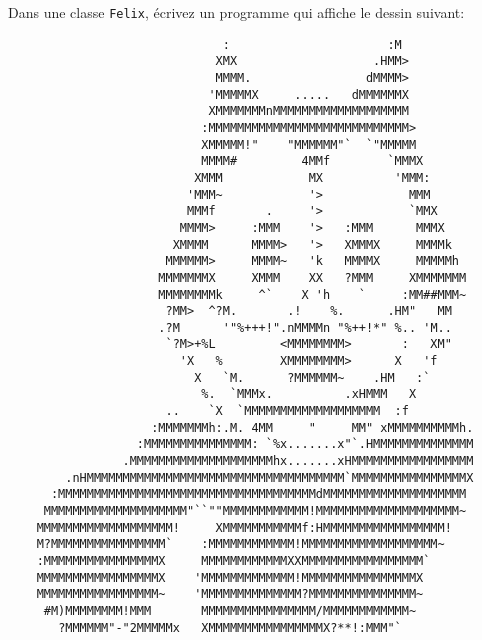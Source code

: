 \documentclass[a4paper,11pt]{article}
\begin{document}
	\newpage
	\Exercice{}
		Dans une classe \texttt{Felix}, écrivez un programme qui affiche le dessin suivant:

	\begin{verbatim}
	                          :                      :M
	                         XMX                   .HMM>
	                         MMMM.                dMMMM>
	                        'MMMMMX     .....   dMMMMMMX
	                        XMMMMMMMnMMMMMMMMMMMMMMMMMMM
	                       :MMMMMMMMMMMMMMMMMMMMMMMMMMMM>
	                       XMMMMM!"    "MMMMMM"`  `"MMMMM
	                       MMMM#         4MMf        `MMMX
	                      XMMM            MX          'MMM:
	                     'MMM~            '>            MMM
	                     MMMf       .     '>            `MMX
	                    MMMM>     :MMM    '>   :MMM      MMMX
	                   XMMMM      MMMM>   '>   XMMMX     MMMMk
	                  MMMMMM>     MMMM~   'k   MMMMX     MMMMMh
	                 MMMMMMMX     XMMM    XX   ?MMM     XMMMMMMM
	                 MMMMMMMMk     ^`    X 'h    `     :MM##MMM~
	                  ?MM>  ^?M.       .!    %.      .HM"   MM
	                 .?M      '"%+++!".nMMMMn "%++!*" %.. 'M..
	                  `?M>+%L         <MMMMMMMM>       :   XM"
	                    'X   %        XMMMMMMMM>      X   'f
	                      X   `M.      ?MMMMMM~    .HM   :`
	                       %.  `MMMx.          .xHMMM   X
	                  ..    `X  `MMMMMMMMMMMMMMMMMMM  :f
	                :MMMMMMMh:.M. 4MM     "     MM" xMMMMMMMMMMh.
	              :MMMMMMMMMMMMMMM: `%x.......x"`.HMMMMMMMMMMMMMM
	            .MMMMMMMMMMMMMMMMMMMMhx.......xHMMMMMMMMMMMMMMMMM
	    .nHMMMMMMMMMMMMMMMMMMMMMMMMMMMMMMMMMMMM`MMMMMMMMMMMMMMMMX
	  :MMMMMMMMMMMMMMMMMMMMMMMMMMMMMMMMMMMMdMMMMMMMMMMMMMMMMMMMM
	 MMMMMMMMMMMMMMMMMMMM"``""MMMMMMMMMMMM!MMMMMMMMMMMMMMMMMMMM~
	MMMMMMMMMMMMMMMMMMM!     XMMMMMMMMMMMf:HMMMMMMMMMMMMMMMMM!
	M?MMMMMMMMMMMMMMMM`    :MMMMMMMMMMMM!MMMMMMMMMMMMMMMMMMM~
	:MMMMMMMMMMMMMMMMX     MMMMMMMMMMMMXXMMMMMMMMMMMMMMMMM`
	MMMMMMMMMMMMMMMMMX    'MMMMMMMMMMMMM!MMMMMMMMMMMMMMMMX
	MMMMMMMMMMMMMMMMM~    'MMMMMMMMMMMMMM?MMMMMMMMMMMMMMM~
	 #M)MMMMMMMM!MMM       MMMMMMMMMMMMMMMM/MMMMMMMMMMMM~
	   ?MMMMMM"-"2MMMMMx   XMMMMMMMMMMMMMMMMX?**!:MMM"`
	\end{verbatim}
\end{document}
